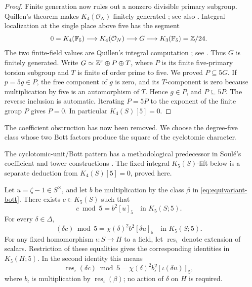 \begin{proof}
Finite generation now rules out a nonzero divisible primary subgroup.
Quillen's theorem makes $K_4(\mathcal O_N)$ finitely generated
\cite[\S1, Theorem~1 and Remark~(2)]{Quillen1973Finite}; see also
\cite[IV.6.9]{Weibel2013}.  Integral localization at the single place
above five has the segment
\[
 0=K_4(\mathbb F_5)\longrightarrow K_4(\mathcal O_N)
 \longrightarrow G\longrightarrow K_3(\mathbb F_5)=\mathbb Z/24.
\]
The two finite-field values are Quillen's integral computation
\cite{Quillen1972FiniteFields}; see \cite[IV.1.13]{Weibel2013}.
Thus $G$ is finitely generated.  Write
$G\simeq\mathbb Z^r\oplus P\oplus T$, where $P$ is its finite five-primary
torsion subgroup and $T$ is finite of order prime to five.  We proved
$P\subseteq5G$.  If $p=5g\in P$, the free component of $g$ is zero,
and its $T$-component is zero because multiplication by five is an
automorphism of $T$.  Hence $g\in P$, and $P\subseteq5P$.  The reverse
inclusion is automatic.  Iterating $P=5P$ to the exponent of the finite
group $P$ gives $P=0$.  In particular $K_4(S)[5]=0$.
\end{proof}

The coefficient obstruction has now been removed.  We choose the
degree-five class whose two Bott factors produce the square of the
cyclotomic character.

The cyclotomic-unit/Bott pattern has a methodological predecessor in
Soul\'e's coefficient and tower constructions
\cite[\S\S4.2--4.4, pp.~239--240]{Soule1987}.  The fixed integral
$K_5(S)$-lift below is a separate deduction from
$K_4(S)[5]=0$, proved here.

\begin{proposition}
\label{prop:integral-lift}
Let $u=\zeta-1\in S^\times$, and let $b$ be multiplication by the
class $\beta$ in \eqref{eq:equivariant-bott}.  There exists
$c\in K_5(S)$ such that
\begin{equation}
 \label{eq:integral-c}
 c\bmod5=b^2[u]_5\quad\text{in }K_5(S;5).
\end{equation}
For every $\delta\in\Delta$,
\begin{equation}
 \label{eq:conjugate-c}
 (\delta c)\bmod5=\chi(\delta)^2b^2[\delta u]_5
       \quad\text{in }K_5(S;5).
\end{equation}
For any fixed homomorphism $\iota:S\to H$ to a field, let
$\operatorname{res}_\iota$ denote extension of scalars.  Restriction of
these equalities gives the corresponding identities in $K_5(H;5)$.
In the second identity this means
\[
 \operatorname{res}_\iota(\delta c)\bmod5
 =\chi(\delta)^2 b_\iota^2[\iota(\delta u)]_5,
\]
where $b_\iota$ is multiplication by $\operatorname{res}_\iota(\beta)$; no action of
$\delta$ on $H$ is required.
\end{proposition}

